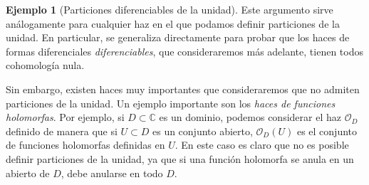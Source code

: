 \documentclass[12pt,a4paper]{article}
\theoremstyle{definition} \newtheorem{defn}[thm]{Definición}
\theoremstyle{definition} \newtheorem{ejemplo}[thm]{Ejemplo}
\theoremstyle{definition} \newtheorem{ejercicio}[thm]{Ejercicio}
\def\CC{\mathbb{C}}
\def\OO{\mathscr{O}}
\begin{document}
\begin{ejemplo}[Particiones diferenciables de la unidad]
  Este argumento sirve análogamente para cualquier haz en el que podamos definir particiones de la unidad. En particular, se generaliza directamente para probar que los haces de formas diferenciales \emph{diferenciables}, que consideraremos más adelante, tienen todos cohomología nula. 
  
  Sin embargo, existen haces muy importantes que consideraremos que no admiten particiones de la unidad. Un ejemplo importante son los \emph{haces de funciones holomorfas}. Por ejemplo, si $D\subset \CC$ es un dominio, podemos considerar el haz $\OO_D$ definido de manera que si $U\subset D$ es un conjunto abierto, $\OO_D(U)$ es el conjunto de funciones holomorfas definidas en $U$. En este caso es claro que no es posible definir particiones de la unidad, ya que si una función holomorfa se anula en un abierto de $D$, debe anularse en todo $D$.
\end{ejemplo}
\end{document}
